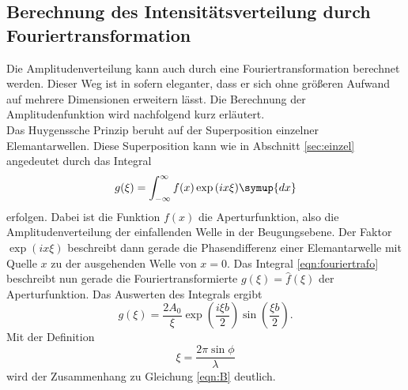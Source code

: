 \subsection{Berechnung des Intensitätsverteilung durch Fouriertransformation}
\label{sec:fourier}
Die Amplitudenverteilung kann auch durch eine Fouriertransformation berechnet werden. Dieser Weg ist in sofern eleganter, dass er sich ohne 
größeren Aufwand auf mehrere Dimensionen erweitern lässt. Die Berechnung der Amplitudenfunktion wird nachfolgend kurz erläutert.
\\\noindent
Das Huygenssche Prinzip beruht auf der Superposition einzelner Elemantarwellen. Diese Superposition kann wie in Abschnitt \ref{sec:einzel} 
angedeutet durch das Integral
\begin{equation}
    g(\xi)=\int_{-\infty}^{\infty}f(x)\exp{(ix\xi)}\symup{dx}
    \label{eqn:fouriertrafo}
\end{equation}
erfolgen. Dabei ist die Funktion $f(x)$ die Aperturfunktion, also die Amplitudenverteilung der einfallenden Welle in der Beugungsebene. 
Der Faktor $\exp{(ix\xi)}$ beschreibt dann gerade die Phasendifferenz einer Elemantarwelle mit Quelle $x$ zu der ausgehenden Welle von $x=0$.
Das Integral \ref{eqn:fouriertrafo} beschreibt nun gerade die Fouriertransformierte $g(\xi)=\hat{f}(\xi)$ der Aperturfunktion. Das Auswerten
des Integrals ergibt 
\begin{equation*}
    g(\xi)=\frac{2A_0}{\xi}\exp{\left(\frac{i\xi b}{2}\right)}\sin{\left(\frac{\xi b}{2}\right)}    .
\end{equation*}
Mit der Definition 
\begin{equation*}
    \xi=\frac{2 \pi \sin{\phi}}{\lambda}    
\end{equation*}
wird der Zusammenhang zu Gleichung \ref{eqn:B} deutlich.